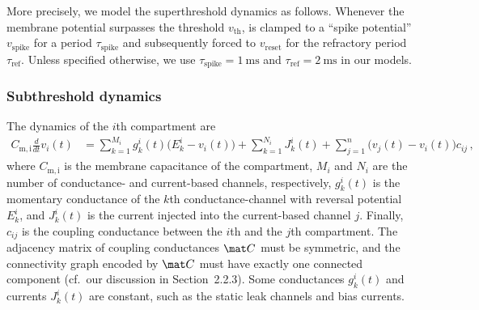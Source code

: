 More precisely, we model the superthreshold dynamics as follows.
Whenever the membrane potential \vMem surpasses the threshold $v_\mathrm{th}$, \vMem is clamped to a \enquote{spike potential} $v_\mathrm{spike}$ for a period $\tau_\mathrm{spike}$ and subsequently forced to $v_\mathrm{reset}$ for the refractory period $\tau_\mathrm{ref}$.
Unless specified otherwise, we use $\tau_\mathrm{spike} = \SI{1}{\milli\second}$ and $\tau_\mathrm{ref} = \SI{2}{\milli\second}$ in our models.

\subsubsection{Subthreshold dynamics}
The dynamics of the $i$th compartment are
\begin{align}
	C_\mathrm{m, i} \frac{d}{dt} v_i(t) &=
		\sum_{k=1}^{M_i} g_k^i(t) \bigl( E_k^i - v_i(t) \bigr) +
		\sum_{k=1}^{N_i} J_k^i(t) +
		\sum_{j=1}^{n} \bigl(v_j(t) - v_i(t)\bigr) c_{ij} \,,
\label{eqn:nlif_single_compartment}
\end{align}
where $C_\mathrm{m, i}$ is the membrane capacitance of the compartment, $M_i$ and $N_i$ are the number of conductance- and current-based channels, respectively, $g_{k}^i(t)$ is the momentary conductance of the $k$th conductance-channel with reversal potential $E_{k}^i$, and $J_{k}^i(t)$ is the current injected into the current-based channel $j$.
Finally, $c_{ij}$ is the coupling conductance between the $i$th and the $j$th compartment.
The adjacency matrix of coupling conductances $\mat C$ must be symmetric, and the connectivity graph encoded by $\mat C$ must have exactly one connected component (cf.~our discussion in Section~2.2.3).
Some conductances $g_{k}^i(t)$ and currents $J_{k}^i(t)$ are constant, such as the static leak channels and bias currents.


